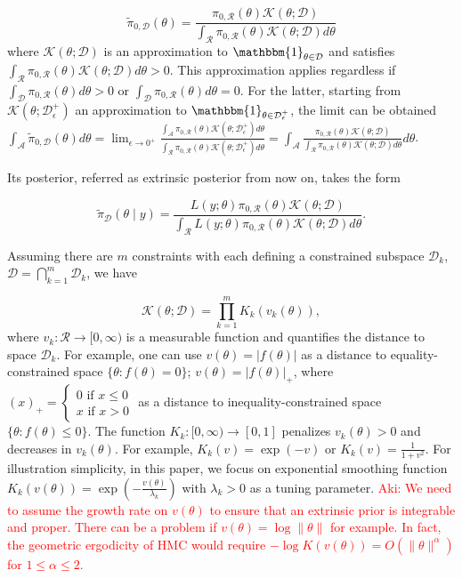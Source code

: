 \documentclass[10pt]{article}
\newcommand{\aki}[1]{\textcolor{red}{Aki: #1}}
\newcommand{\mc}[1]{\mathcal{#1}}
\DeclareMathOperator{\1}{\mathbbm{1}}
\begin{document}
\begin{equation}
\label{extrinsic_prior}
	\tilde{\pi}_{0,\mc D}(\theta) = \frac{ \pi_{0,\mc R}(\theta) \mc{K}( \theta; \mc D) }{ \int_{\mc R} \pi_{0,\mc R}(\theta) \mc{K}(\theta; \mc D)d\theta }
\end{equation}
where $\mc K(\theta; \mc D)$ is an approximation to $\mathbbm{1}_{\theta\in \mc D}$ and satisfies  $ \int_{\mc R} \pi_{0,\mc R}(\theta) \mc{K}(\theta; \mc D)d\theta>0$. 
This approximation applies regardless if $\int_{\mc D} \pi_{0,\mc R}(\theta) d\theta>0$ or $\int_{\mc D} \pi_{0,\mc R}(\theta) d\theta=0$. For the latter, starting from $\mc K(\theta;  \mc D^+_\epsilon)$ an approximation to $\mathbbm{1}_{\theta\in  \mc D^+_\epsilon}$, the limit can be obtained $
	\int_{\mc A} \tilde{\pi}_{0,\mc D}(\theta) d \theta =  \lim_{\epsilon\rightarrow 0^+}\frac{\int_{\mc A}  \pi_{0,\mc R}(\theta) \mc{K}( \theta; \mc D^+_\epsilon)d\theta }{ \int_{\mc R} \pi_{0,\mc R}(\theta) \mc{K}(\theta; \mc D^+_\epsilon)d\theta } = 	\int_{\mc A} \frac{ \pi_{0,\mc R}(\theta) \mc{K}( \theta; \mc D) }{ \int_{\mc R} \pi_{0,\mc R}(\theta) \mc{K}(\theta; \mc D)d\theta } d\theta$.

Its posterior, referred as extrinsic posterior from now on, takes the form

\begin{equation}
\label{extrinsic_posterior}
	\tilde{\pi}_{\mc D}(\theta \mid y) = \frac{ L(y;\theta)\pi_{0,\mc R}(\theta) \mc{K}( \theta; \mc D) }{ \int_{\mc R} L(y;\theta)\pi_{0,\mc R}(\theta) \mc{K}(\theta; \mc D)d\theta }.
\end{equation}


Assuming there are $m$ constraints with each defining a constrained subspace $\mc D_k$, $\mc D = \bigcap_{k=1}^m\mc D_k$, we have

\begin{equation}
\label{smoothing}
\mc K(\theta; \mc D)= \prod_{k=1}^m K_k(v_k(\theta)),
\end{equation}
where $v_k: \mc R \rightarrow [0,\infty)$ is a measurable function and quantifies the distance to space $\mc D_k$. For example, one can use $v(\theta)=|f(\theta)|$ as a distance to equality-constrained space  $\{\theta:f(\theta)=0\}$; $v(\theta)=|f(\theta)|_+$, where $(x)_+ = \left\{\begin{array}{cc}  0 \text{ if } x\le 0 \\ x \text{ if } x> 0\end{array}\right.$ as a distance to inequality-constrained space  $\{\theta:f(\theta) \le 0\}$. The function $K_k:[0,\infty)\rightarrow [0,1]$ penalizes $v_k(\theta)>0$ and decreases in $v_k(\theta)$. For example, $K_k(v)=\exp(-v)$ or $K_k(v)=\frac{1}{1+v^2}$. For illustration simplicity, in this paper, we focus on exponential smoothing function $K_k(v(\theta))=\exp(-\frac{v(\theta)}{\lambda_k})$ with $\lambda_k>0$ as a tuning parameter. \aki{We need to assume the growth rate on $v(\theta)$ to ensure that an extrinsic prior is integrable and proper. There can be a problem if $v(\theta) = \log \| \theta \|$ for example. In fact, the geometric ergodicity of HMC would require $- \log K(v(\theta)) = O(\| \theta \|^\alpha)$ for $1 \leq \alpha \leq 2$.} 
\end{document}
